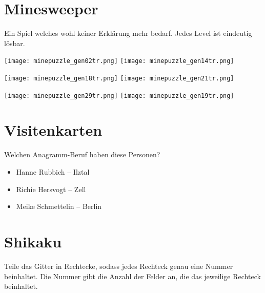 	\begin{multicols}{2}
	\section*{Minesweeper}
	Ein Spiel welches wohl keiner Erklärung mehr bedarf. Jedes Level ist eindeutig lösbar.

	\texttt{[image: minepuzzle\_gen02tr.png]}
	\texttt{[image: minepuzzle\_gen14tr.png]}

	\texttt{[image: minepuzzle\_gen18tr.png]}
	\texttt{[image: minepuzzle\_gen21tr.png]}

	\texttt{[image: minepuzzle\_gen29tr.png]}
	\texttt{[image: minepuzzle\_gen19tr.png]}

	\section*{Visitenkarten}
	Welchen Anagramm-Beruf haben diese Personen?\\

	\begin{itemize}
		\item[]{Hanne Rubbich -- Ilztal}
		\item[]{Richie Hersvogt -- Zell}
		\item[]{Meike Schmettelin -- Berlin}
	\end{itemize}


	\columnbreak
	\section*{Shikaku}

	Teile das Gitter in Rechtecke, sodass jedes Rechteck genau eine Nummer beinhaltet.
	Die Nummer gibt die Anzahl der Felder an, die das jeweilige Rechteck beinhaltet.


\end{multicols}
